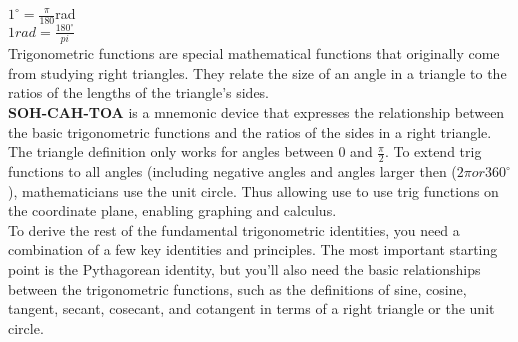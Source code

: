 \documentclass{article}
\begin{document}
$1^\circ = \frac{\pi}{180}$rad\\
$1 rad = \frac{180^\circ}{pi}$\\

Trigonometric functions are special mathematical functions that originally come from studying right triangles. They relate the size of an angle in a triangle to the ratios of the lengths of the triangle's sides.\\

\textbf{SOH-CAH-TOA} is a mnemonic device that expresses the relationship between the basic trigonometric functions and the ratios of the sides in a right triangle.\\

The triangle definition only works for angles between 0 and $\frac{\pi}{2}$. To extend trig functions to all angles (including negative angles and angles larger then ($2\pi or 360^{\circ}$), mathematicians use the unit circle. Thus allowing use to use trig functions on the coordinate plane, enabling graphing and calculus.\\

To derive the rest of the fundamental trigonometric identities, you need a combination of a few key identities and principles. The most important starting point is the Pythagorean identity, but you’ll also need the basic relationships between the trigonometric functions, such as the definitions of sine, cosine, tangent, secant, cosecant, and cotangent in terms of a right triangle or the unit circle. \\
\end{document}
